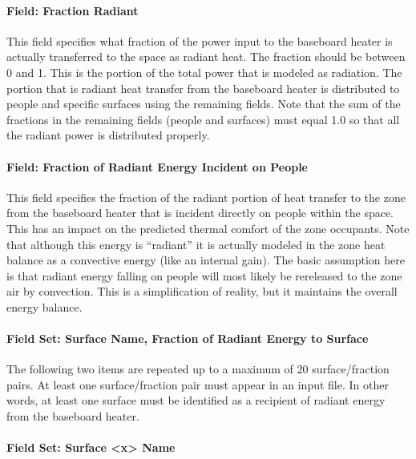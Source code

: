\paragraph{Field: Fraction Radiant}\label{field-fraction-radiant-2-000}

This field specifies what fraction of the power input to the baseboard heater is actually transferred to the space as radiant heat. The fraction should be between 0 and 1. This is the portion of the total power that is modeled as radiation. The portion that is radiant heat transfer from the baseboard heater is distributed to people and specific surfaces using the remaining fields. Note that the sum of the fractions in the remaining fields (people and surfaces) must equal 1.0 so that all the radiant power is distributed properly.

\paragraph{Field: Fraction of Radiant Energy Incident on People}\label{field-fraction-of-radiant-energy-incident-on-people-2}

This field specifies the fraction of the radiant portion of heat transfer to the zone from the baseboard heater that is incident directly on people within the space. This has an impact on the predicted thermal comfort of the zone occupants. Note that although this energy is ``radiant'' it is actually modeled in the zone heat balance as a convective energy (like an internal gain). The basic assumption here is that radiant energy falling on people will most likely be rereleased to the zone air by convection. This is a simplification of reality, but it maintains the overall energy balance.

\paragraph{Field Set: Surface Name, Fraction of Radiant Energy to Surface}\label{field-set-surface-name-fraction-of-radiant-energy-to-surface-2}

The following two items are repeated up to a maximum of 20 surface/fraction pairs. At least one surface/fraction pair must appear in an input file. In other words, at least one surface must be identified as a recipient of radiant energy from the baseboard heater.

\paragraph{Field Set: Surface \textless{}x\textgreater{} Name}\label{field-set-surface-x-name}

